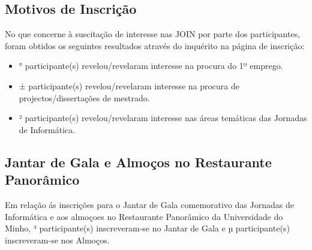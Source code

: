 \documentclass[a4paper]{article}
\begin{document}
\subsection{Motivos de Inscrição}
No que concerne à suscitação de interesse nas JOIN por parte dos participantes, foram obtidos os seguintes resultados através do inquérito na página de inscrição:
\begin{itemize}
  \item ° participante(s) revelou/revelaram interesse na procura do 1º emprego.
  \item ± participante(s) revelou/revelaram interesse na procura de projectos/dissertações de mestrado.
  \item ² participante(s) revelou/revelaram interesse nas áreas temáticas das Jornadas de Informática.
\end{itemize}
\subsection{Jantar de Gala e Almoços no Restaurante Panorâmico}
Em relação ás inscrições para o Jantar de Gala comemorativo das Jornadas de Informática e aos almoçoes no Restaurante Panorâmico da Universidade do Minho, ³ participante(s) inscreveram-se no Jantar de Gala e µ participante(s) inscreveram-se nos Almoços.
\end{document}
